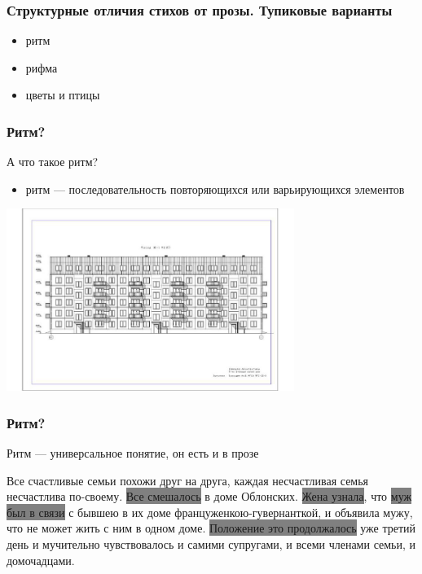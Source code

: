 \documentclass{beamer}
\begin{document}
\begin{frame}
\frametitle{Структурные отличия стихов от прозы. Тупиковые варианты}

\begin{itemize}
\item ритм
\item рифма
\item цветы и птицы
\end{itemize}

\end{frame}


\begin{frame}
\frametitle{Ритм?}

А что такое ритм?
\begin{itemize}
\item ритм — последовательность повторяющихся или варьирующихся элементов
\end{itemize}

\begin{center}
\includegraphics[width=0.7\textwidth]{building.png}
\end{center}

\end{frame}


\begin{frame}
\frametitle{Ритм?}

Ритм — универсальное понятие, он есть и в прозе

 Все \color{blue}счастливые семьи \color{black}похожи друг на друга, каждая \color{blue}несчастливая семья \color{black}несчастлива по-своему.
   \colorbox{gray}{Все смешалось} в доме Облонских. \colorbox{gray}{Жена узнала}, что \colorbox{gray}{муж был в связи} с бывшею в их доме француженкою-гувернанткой, и объявила мужу, что не может жить с ним в одном доме. \colorbox{gray}{Положение это продолжалось} уже третий день и мучительно чувствовалось и самими супругами, и всеми членами семьи, и домочадцами.

\end{frame}
\end{document}
